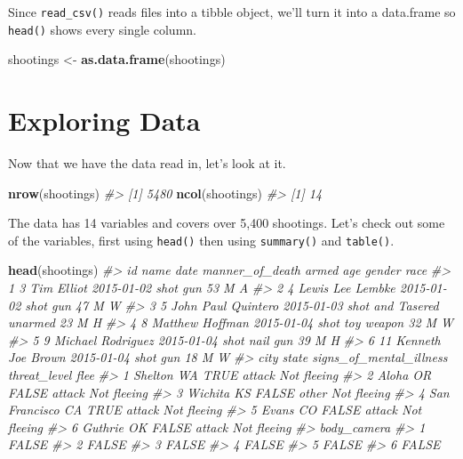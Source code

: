 \documentclass[
  12pt,
]{book}
\newenvironment{Shaded}{\begin{snugshade}}{\end{snugshade}}
\newcommand{\CommentTok}[1]{\textcolor[rgb]{0.37,0.37,0.37}{\textit{#1}}}
\newcommand{\KeywordTok}[1]{\textcolor[rgb]{0.27,0.27,0.27}{\textbf{#1}}}
\newcommand{\NormalTok}[1]{#1}
\newcommand{\StringTok}[1]{\textcolor[rgb]{0.5,0.5,0.5}{#1}}
\begin{document}
Since \texttt{read\_csv()} reads files into a tibble object, we'll turn it into a data.frame so \texttt{head()} shows every single column.

\begin{Shaded}
\begin{Highlighting}[]
\NormalTok{shootings <{-}}\StringTok{ }\KeywordTok{as.data.frame}\NormalTok{(shootings)}
\end{Highlighting}
\end{Shaded}

\hypertarget{exploring-data}{%
\section{Exploring Data}\label{exploring-data}}

Now that we have the data read in, let's look at it.

\begin{Shaded}
\begin{Highlighting}[]
\KeywordTok{nrow}\NormalTok{(shootings)}
\CommentTok{\#> [1] 5480}
\KeywordTok{ncol}\NormalTok{(shootings)}
\CommentTok{\#> [1] 14}
\end{Highlighting}
\end{Shaded}

The data has 14 variables and covers over 5,400 shootings. Let's check out some of the variables, first using \texttt{head()} then using \texttt{summary()} and \texttt{table()}.

\begin{Shaded}
\begin{Highlighting}[]
\KeywordTok{head}\NormalTok{(shootings)}
\CommentTok{\#>   id               name       date  manner\_of\_death      armed age gender race}
\CommentTok{\#> 1  3         Tim Elliot 2015{-}01{-}02             shot        gun  53      M    A}
\CommentTok{\#> 2  4   Lewis Lee Lembke 2015{-}01{-}02             shot        gun  47      M    W}
\CommentTok{\#> 3  5 John Paul Quintero 2015{-}01{-}03 shot and Tasered    unarmed  23      M    H}
\CommentTok{\#> 4  8    Matthew Hoffman 2015{-}01{-}04             shot toy weapon  32      M    W}
\CommentTok{\#> 5  9  Michael Rodriguez 2015{-}01{-}04             shot   nail gun  39      M    H}
\CommentTok{\#> 6 11  Kenneth Joe Brown 2015{-}01{-}04             shot        gun  18      M    W}
\CommentTok{\#>            city state signs\_of\_mental\_illness threat\_level        flee}
\CommentTok{\#> 1       Shelton    WA                    TRUE       attack Not fleeing}
\CommentTok{\#> 2         Aloha    OR                   FALSE       attack Not fleeing}
\CommentTok{\#> 3       Wichita    KS                   FALSE        other Not fleeing}
\CommentTok{\#> 4 San Francisco    CA                    TRUE       attack Not fleeing}
\CommentTok{\#> 5         Evans    CO                   FALSE       attack Not fleeing}
\CommentTok{\#> 6       Guthrie    OK                   FALSE       attack Not fleeing}
\CommentTok{\#>   body\_camera}
\CommentTok{\#> 1       FALSE}
\CommentTok{\#> 2       FALSE}
\CommentTok{\#> 3       FALSE}
\CommentTok{\#> 4       FALSE}
\CommentTok{\#> 5       FALSE}
\CommentTok{\#> 6       FALSE}
\end{Highlighting}
\end{Shaded}
\end{document}
